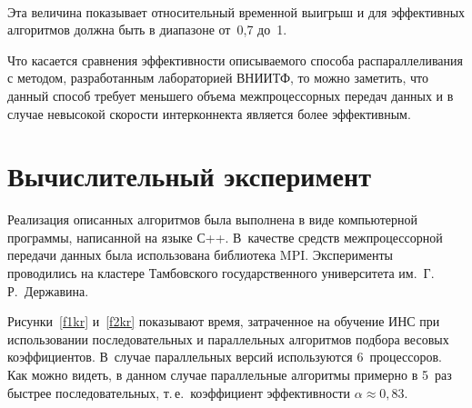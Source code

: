 \begin{multicols}{2}
\begin{figure*} %
\vspace*{1pt}
\begin{center}
\mbox{%
\epsfxsize=165.8756mm
}
\end{center}
\begin{minipage}[t]{81mm}
\vspace*{-15pt}
\end{minipage}
\hfill
\begin{minipage}[t]{81mm}
\vspace*{-15pt}
\end{minipage}
\vspace*{-2pt}
\end{figure*}

 Эта величина показывает относительный временной выигрыш и для эффективных
алгоритмов должна быть в диапазоне от~0,7 до~1.

 Что касается сравнения эффективности описываемого способа распараллеливания с
методом, разработанным лабораторией ВНИИТФ, то можно заметить, что данный способ
требует меньшего объема межпроцессорных передач данных и в случае невысокой скорости
интерконнекта является более эффективным.

\vspace*{-5pt}

\section{Вычислительный эксперимент}

 Реализация описанных алгоритмов была выполнена в виде компьютерной программы,
написанной на языке С++. В~качестве средств межпроцессорной передачи данных была
использована библио\-те\-ка MPI. Эксперименты проводились на клас\-те\-ре Тамбовского
государственного университета им.~Г.\,Р.~Державина.

 Рисунки~\ref{f1kr} и~\ref{f2kr} показывают время, затраченное на обучение ИНС при
использовании последовательных и
параллельных алгоритмов подбора весовых коэффициентов. В~случае параллельных версий используются 6~процессоров. Как можно
видеть, в данном случае параллельные алгоритмы примерно в 5~раз быстрее
последовательных, т.\,е.\ коэффициент эффективности $\alpha\approx 0{,}83$.



\end{multicols}
